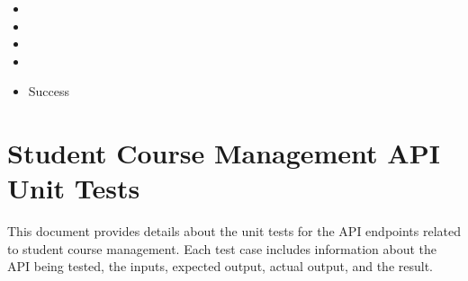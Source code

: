 \documentclass[letterpaper,10pt,english]{sphinxmanual}
\begin{document}
\subsection{}
\label{\detokenize{src/adminTestCases:test-case-test-get-all-courses-no-data}}\begin{itemize}
\item {} 
\sphinxAtStartPar
{} 

\item {} 
\sphinxAtStartPar
{}

\begin{sphinxVerbatim}[commandchars=\\\{\}]
\end{sphinxVerbatim}

\item {} 
\sphinxAtStartPar
{}

\begin{sphinxVerbatim}[commandchars=\\\{\}]
\end{sphinxVerbatim}

\item {} 
\sphinxAtStartPar
{}

\begin{sphinxVerbatim}[commandchars=\\\{\}]
\end{sphinxVerbatim}

\item {} 
\sphinxAtStartPar
{} Success

\end{itemize}

\sphinxstepscope


\chapter{Student Course Management API Unit Tests}
\label{\detokenize{src/studentTestCases:student-course-management-api-unit-tests}}\label{\detokenize{src/studentTestCases::doc}}
\sphinxAtStartPar
This document provides details about the unit tests for the API endpoints related to student course management. Each test case includes information about the API being tested, the inputs, expected output, actual output, and the result.
\end{document}
